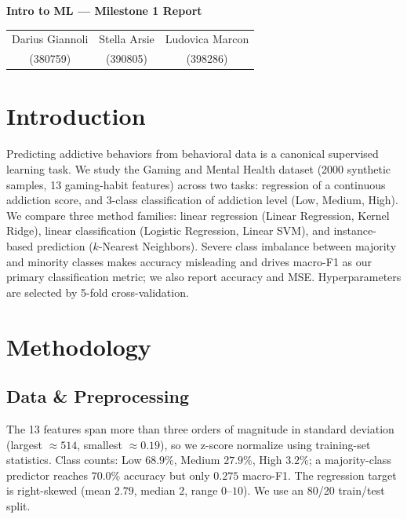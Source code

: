 \documentclass[10pt,twocolumn,a4paper]{article}
\begin{document}
\begin{center}
{\Large\bfseries Intro to ML — Milestone 1 Report}\\[0.6em]
{\footnotesize
\begin{tabular}{c c c}
Darius Giannoli & Stella Arsie & Ludovica Marcon \\
(380759) & (390805) & (398286)
\end{tabular}}
\end{center}

\section{Introduction}

Predicting addictive behaviors from behavioral data is a canonical supervised learning task. We study the Gaming and Mental Health dataset (2000 synthetic samples,
13 gaming-habit features) across two tasks: regression of a continuous
addiction score, and 3-class classification of addiction level (Low,
Medium, High). We compare three method families: linear regression
(Linear Regression, Kernel Ridge), linear classification (Logistic
Regression, Linear SVM), and instance-based prediction
($k$-Nearest Neighbors). Severe class imbalance between majority and
minority classes makes accuracy misleading and drives macro-F1 as our
primary classification metric; we also report accuracy and MSE.
Hyperparameters are selected by 5-fold cross-validation.

\section{Methodology}
\subsection{Data \& Preprocessing}
The 13 features span more than three orders of magnitude in standard
deviation (largest $\approx\!514$, smallest $\approx\!0.19$), so we
z-score normalize using training-set statistics. Class counts: Low
$68.9\%$, Medium $27.9\%$, High $3.2\%$; a majority-class predictor
reaches $70.0\%$ accuracy but only $0.275$ macro-F1. The regression
target is right-skewed (mean $2.79$, median $2$, range $0$--$10$).
We use an 80/20 train/test split.
\end{document}

